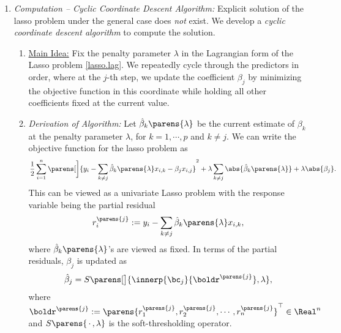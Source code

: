 \documentclass[12pt]{article}
\begin{document}
\begin{enumerate}[label=\textbf{\arabic*.}]
\begin{enumerate}
		\item \textit{Computation -- Cyclic Coordinate Descent Algorithm:} Explicit solution of the lasso problem under the general case does \emph{not} exist. We develop a \emph{cyclic coordinate descent algorithm} to compute the solution. 
		
		\begin{enumerate}
			\item \underline{Main Idea:} Fix the penalty parameter $\lambda$ in the Lagrangian form of the Lasso problem \eqref{lasso.lag}. We repeatedly cycle through the predictors in order, where at the $j$-th step, we update the coefficient $\beta_j$ by minimizing the objective function in this coordinate while holding all other coefficients fixed at the current value. 

			\item \textit{Derivation of Algorithm:} Let $\hat{\beta}_k \parens{\lambda}$ be the current estimate of $\beta_k$ at the penalty parameter $\lambda$, for $k = 1, \cdots, p$ and $k \neq j$. We can write the objective function for the lasso problem as 
			\begin{align*}
				\frac{1}{2} \sum_{i=1}^n \parens[\bigg]{y_i - \sum_{k \neq j} \hat{\beta}_k \parens{\lambda} x_{i,k} - \beta_j x_{i,j}}^2 + \lambda \sum_{k \neq j} \abs{\hat{\beta}_k \parens{\lambda}} + \lambda \abs{\beta_j}. 
			\end{align*}
			This can be viewed as a univariate Lasso problem with the response variable being the partial residual 
			\begin{align*}
				r_i^{\parens{j}} := y_i - \sum_{k\neq j} \hat{\beta}_k \parens{\lambda} x_{i,k}, 
			\end{align*}
			where $\hat{\beta}_k \parens{\lambda}$'s are viewed as fixed. In terms of the partial residuals, $\beta_j$ is updated as 
			\begin{align*}
				\hat{\beta}_j = S \parens[\big]{\innerp{\bc_j}{\boldr^{\parens{j}}}, \lambda}, 
			\end{align*}
			where $\boldr^{\parens{j}} := \parens{r_1^{\parens{j}}, r_2^{\parens{j}}, \cdots, r_n^{\parens{j}}}^\top \in \Real^n$ and $S \parens{\,\cdot\,, \lambda}$ is the soft-thresholding operator. 
			

\end{enumerate}
\end{enumerate}
\end{enumerate}
\end{document}
